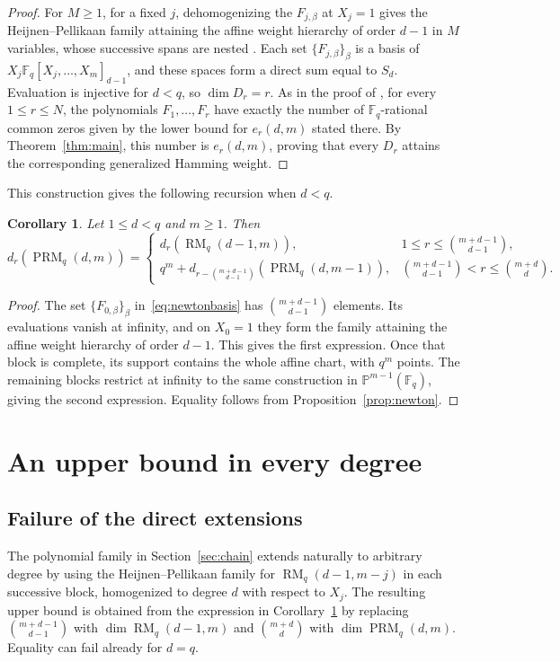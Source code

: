 \documentclass[11pt]{amsart}
\newtheorem{corollary}[theorem]{Corollary}
\theoremstyle{definition}
\newcommand{\F}{\mathbb F}
\newcommand{\PP}{\mathbb P}
\newcommand{\PRM}{\operatorname{PRM}}
\newcommand{\RM}{\operatorname{RM}}
\numberwithin{equation}{section}
\begin{document}
\begin{proof}
For $M\ge1$, for a fixed $j$, dehomogenizing the $F_{j,\beta}$ at $X_j=1$ gives
the Heijnen--Pellikaan family attaining the affine weight hierarchy
of order $d-1$ in $M$ variables, whose successive spans are nested
\cite[Thm.~5.10 and Cor.~5.12]{HP}. Each set $\{F_{j,\beta}\}_\beta$ is a basis of
$X_j\F_q[X_j,\ldots,X_m]_{d-1}$, and these spaces form a direct
sum equal to $S_d$. Evaluation is injective for $d<q$, so
$\dim D_r=r$. 
As in the proof of \cite[Thm.~2.3]{BDG22}, for every
$1\le r\le N$, the polynomials $F_1,\ldots,F_r$ have exactly
the number of $\F_q$-rational common zeros given by the
lower bound for $e_r(d,m)$ stated there. By
Theorem~\ref{thm:main}, this number is $e_r(d,m)$, proving
that every $D_r$ attains the corresponding generalized Hamming weight.
\end{proof}

This construction gives the following recursion when $d<q$.

\begin{corollary}\label{cor:recursion}
Let $1\le d<q$ and $m\ge1$. Then
\[
 d_r(\PRM_q(d,m))=
 \begin{cases}
 d_r(\RM_q(d-1,m)),&1\le r\le\binom{m+d-1}{d-1},\\[2mm]
 q^m+d_{r-\binom{m+d-1}{d-1}}(\PRM_q(d,m-1)),&\binom{m+d-1}{d-1}<r\le\binom{m+d}{d}.
 \end{cases}
\]
\end{corollary}

\begin{proof}
The set $\{F_{0,\beta}\}_\beta$ in~\eqref{eq:newtonbasis} has $\binom{m+d-1}{d-1}$ elements. Its
evaluations vanish at infinity, and on $X_0=1$ they form the
family attaining the affine weight hierarchy of order
$d-1$. This gives the first expression. Once that block is
complete, its support contains the whole affine chart, with $q^m$
points. The remaining blocks restrict at infinity to the same
construction in $\PP^{m-1}(\F_q)$, giving the second expression.
Equality follows from Proposition~\ref{prop:newton}.
\end{proof}

\section{An upper bound in every degree}\label{sec:general}

\subsection{Failure of the direct extensions}
The polynomial family in Section~\ref{sec:chain} extends naturally
to arbitrary degree by using the Heijnen--Pellikaan family for
$\RM_q(d-1,m-j)$ in each successive block, homogenized to degree
$d$ with respect to $X_j$. The resulting upper bound is obtained from the expression in
Corollary~\ref{cor:recursion} by replacing
$\binom{m+d-1}{d-1}$ with $\dim\RM_q(d-1,m)$ and
$\binom{m+d}{d}$ with $\dim\PRM_q(d,m)$. Equality can fail already for $d=q$.
\end{document}
